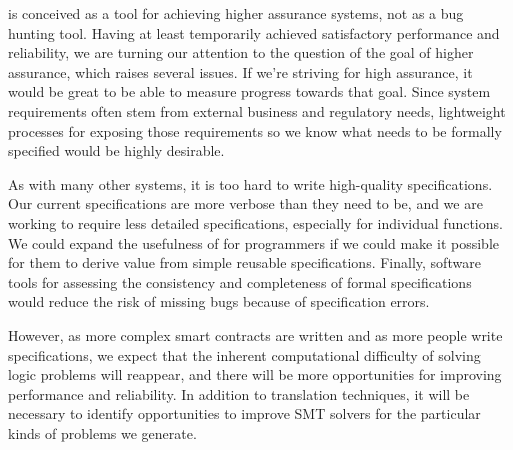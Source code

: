 
\MVP is conceived as a tool for achieving higher assurance systems, not as a bug
hunting tool. Having at least temporarily achieved satisfactory performance and
reliability, we are turning our attention to the question of the goal of higher
assurance, which raises several issues.  If we're striving for high assurance,
it would be great to be able to measure progress towards that goal.  Since
system requirements often stem from external business and regulatory needs,
lightweight processes for exposing those requirements so we know what needs to
be formally specified would be highly desirable.

As with many other systems, it is too hard to write high-quality specifications.
Our current specifications are more verbose than they need to be, and we are
working to require less detailed specifications, especially for individual
functions.  We could expand the usefulness of \MVP for programmers if we could
make it possible for them to derive value from simple reusable specifications.
Finally, software tools for assessing the consistency and completeness of formal
specifications would reduce the risk of missing bugs because of specification
errors.

However, as more complex smart contracts are written and as more people write
specifications, we expect that the inherent computational difficulty of solving
logic problems will reappear, and there will be more opportunities for improving
performance and reliability.  In addition to translation techniques, it will be
necessary to identify opportunities to improve SMT solvers for the particular
kinds of problems we generate.


